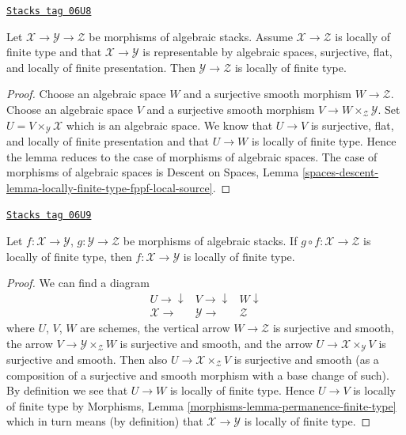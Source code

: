 \begin{lemma}
\label{stacks-morphisms-lemma-check-finite-type-precompose}
\href{https://stacks.math.columbia.edu/tag/06U8}{\texttt{Stacks tag 06U8}}

Let $\mathcal{X} \to \mathcal{Y} \to \mathcal{Z}$ be morphisms of
algebraic stacks. Assume $\mathcal{X} \to \mathcal{Z}$ is locally of finite
type and that $\mathcal{X} \to \mathcal{Y}$ is representable by algebraic
spaces, surjective, flat, and locally of finite presentation.
Then $\mathcal{Y} \to \mathcal{Z}$ is locally of finite type.
\end{lemma}

\begin{proof}
Choose an algebraic space $W$ and a surjective smooth morphism
$W \to \mathcal{Z}$. Choose an algebraic space $V$ and a surjective smooth
morphism $V \to W \times_\mathcal{Z} \mathcal{Y}$. Set
$U = V \times_\mathcal{Y} \mathcal{X}$ which is an algebraic space.
We know that $U \to V$ is surjective, flat, and locally of finite presentation
and that $U \to W$ is locally of finite type.
Hence the lemma reduces to the case of morphisms of algebraic spaces.
The case of morphisms of algebraic spaces is
Descent on Spaces, Lemma
\ref{spaces-descent-lemma-locally-finite-type-fppf-local-source}.
\end{proof}

\begin{lemma}
\label{stacks-morphisms-lemma-finite-type-permanence}
\href{https://stacks.math.columbia.edu/tag/06U9}{\texttt{Stacks tag 06U9}}

Let $f : \mathcal{X} \to \mathcal{Y}$,
$g : \mathcal{Y} \to \mathcal{Z}$ be morphisms of algebraic stacks.
If $g \circ f : \mathcal{X} \to \mathcal{Z}$ is locally of finite type,
then $f : \mathcal{X} \to \mathcal{Y}$ is locally of finite type.
\end{lemma}

\begin{proof}
We can find a diagram
$$
\begin{array}{ccc}U \longrightarrow\downarrow & V \longrightarrow\downarrow & W \downarrow \\ \mathcal{X} \longrightarrow & \mathcal{Y} \longrightarrow & \mathcal{Z}\end{array}
$$
where $U$, $V$, $W$ are schemes, the vertical arrow $W \to \mathcal{Z}$
is surjective and smooth, the arrow $V \to \mathcal{Y} \times_\mathcal{Z} W$
is surjective and smooth, and the arrow
$U \to \mathcal{X} \times_\mathcal{Y} V$ is surjective and smooth.
Then also $U \to \mathcal{X} \times_\mathcal{Z} V$ is surjective and
smooth (as a composition of a surjective and smooth morphism with a
base change of such). By definition we see that $U \to W$ is locally
of finite type. Hence $U \to V$ is locally of finite type by
Morphisms, Lemma \ref{morphisms-lemma-permanence-finite-type}
which in turn means (by definition) that $\mathcal{X} \to \mathcal{Y}$
is locally of finite type.
\end{proof}

